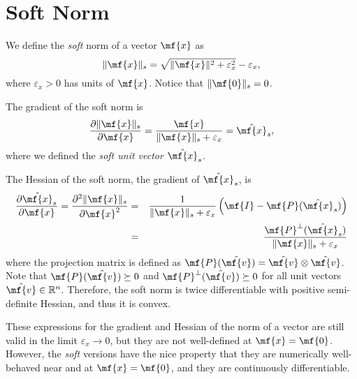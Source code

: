 \section{Soft Norm}
\label{sec:soft_norms}

We define the \emph{soft} norm of a vector $\mf{x}$ as
\begin{equation*}
    \Vert\mf{x}\Vert_s = \sqrt{\Vert\mf{x}\Vert^2+\varepsilon_x^2}-\varepsilon_x
    \label{eq:soft_norm_gradient},
\end{equation*}
where $\varepsilon_x>0$ has units of $\mf{x}$. Notice that $\Vert\mf{0}\Vert_s=
0$.

The gradient of the soft norm is
\begin{equation*}
    \frac{\partial\Vert\mf{x}\Vert_s}{\partial \mf{x}} = \frac{\mf{x}}{\Vert\mf{x}\Vert_s+\varepsilon_x} = \hat{\mf{x}}_s,
\end{equation*}
where we defined the \emph{soft unit vector} $\hat{\mf{x}}_s$.

The Hessian of the soft norm, the gradient of $\hat{\mf{x}}_s$, is
\begin{eqnarray*}
    \frac{\partial\hat{\mf{x}}_s}{\partial\mf{x}}=\frac{\partial^2\Vert\mf{x}\Vert_s}{\partial\mf{x}^2}&=&\frac{1}{\Vert\mf{x}\Vert_s+\varepsilon_x}\left(\mf{I}-\mf{P}(\hat{\mf{x}}_s)\right)\nonumber\\
    &=&\frac{\mf{P}^\perp(\hat{\mf{x}}_s)}{{\Vert\mf{x}\Vert_s+\varepsilon_x}}
\end{eqnarray*}
where the projection matrix is defined as
$\mf{P}(\hat{\mf{v}})=\hat{\mf{v}}\otimes\hat{\mf{v}}$. Note that
$\mf{P}(\hat{\mf{v}}) \succeq 0$ and $\mf{P}^\perp(\hat{\mf{v}}) \succeq 0$ for
all unit vectors $\hat{\mf{v}}\in\mathbb{R}^n$. Therefore, the soft norm is twice
differentiable with positive semi-definite Hessian, and thus it is convex.

These expressions for the gradient and Hessian of the norm of a vector are still
valid in the limit $\varepsilon_x\rightarrow 0$,  but they are not well-defined
at  $\mf{x}=\mf{0}$. However, the \emph{soft} versions have the nice
property that they are numerically well-behaved near and at $\mf{x}=\mf{0}$, and they are
continuously differentiable.

